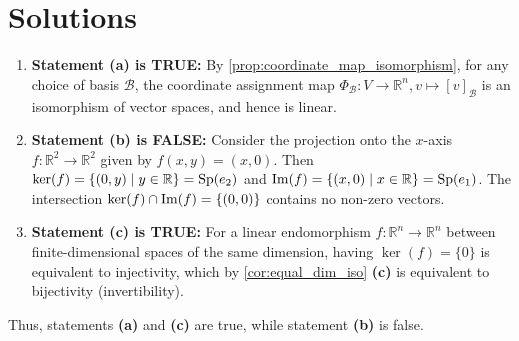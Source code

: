 \section{Solutions}\label{sec:solutions_linear_maps_and_bases}

\begin{exercisesolution*}
\label{sol:properties_coordinate_maps_mc}
\begin{enumerate}[label=\textbf{(\alph*)}]
    \item \textbf{Statement (a) is TRUE:}
    By \cref{prop:coordinate_map_isomorphism}, for any choice of basis $\mathcal{B}$, the coordinate assignment map $\Phi_{\mathcal{B}} \colon V \to \mathbb{R}^n, v \mapsto [v]_{\mathcal{B}}$ is an isomorphism of vector spaces, and hence is linear.

    \item \textbf{Statement (b) is FALSE:}
    Consider the projection onto the $x$-axis $f \colon \mathbb{R}^2 \to \mathbb{R}^2$ given by $f(x, y) = (x, 0)$.
    Then $\ker(f) = \{(0, y) \mid y \in \mathbb{R}\} = \operatorname{Sp}(e_2)$ and $\operatorname{Im}(f) = \{(x, 0) \mid x \in \mathbb{R}\} = \operatorname{Sp}(e_1)$.
    The intersection $\ker(f) \cap \operatorname{Im}(f) = \{(0, 0)\}$ contains no non-zero vectors.

    \item \textbf{Statement (c) is TRUE:}
    For a linear endomorphism $f \colon \mathbb{R}^n \to \mathbb{R}^n$ between finite-dimensional spaces of the same dimension, having $\ker(f) = \{0\}$ is equivalent to injectivity, which by \cref{cor:equal_dim_iso} \textbf{(c)} is equivalent to bijectivity (invertibility).
\end{enumerate}
Thus, statements \textbf{(a)} and \textbf{(c)} are true, while statement \textbf{(b)} is false.
\end{exercisesolution*}

